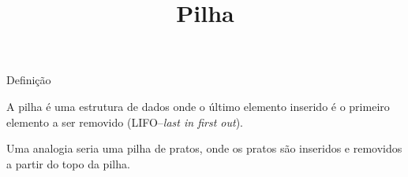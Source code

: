 \title{Pilha}


\frame{\maketitle}

\begin{frame}{\inserttitle}{Definição}
  
  A \alert{pilha} é uma estrutura de dados onde o último elemento
  inserido é o primeiro elemento a ser removido (LIFO--{\it last in first
    out}). \bigskip

  Uma analogia seria uma pilha de pratos, onde os pratos são inseridos e
  removidos a partir do topo da pilha.

\end{frame}

